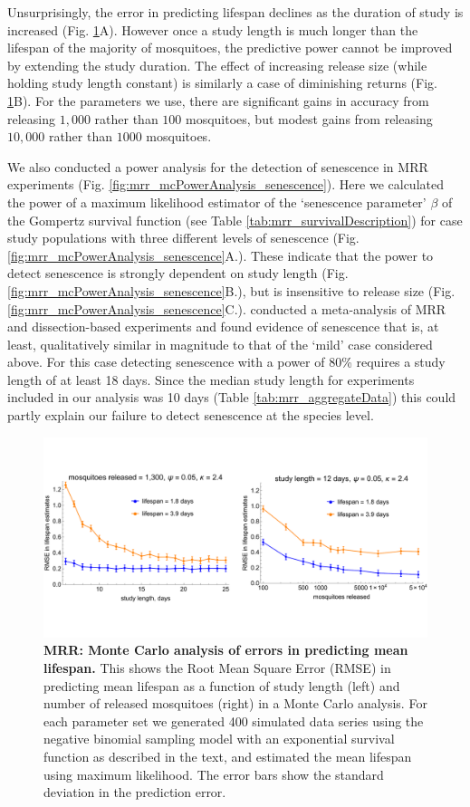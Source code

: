 \documentclass[12pt]{article}
\begin{document}
Unsurprisingly, the error in predicting lifespan declines as the duration of study is increased (Fig. \ref{fig:mrr_mcPowerAnalysis}A). However once a study length is much longer than the lifespan of the majority of mosquitoes, the predictive power cannot be improved by extending the study duration. The effect of increasing release size (while holding study length constant) is similarly a case of diminishing returns (Fig. \ref{fig:mrr_mcPowerAnalysis}B). For the parameters we use, there are significant gains in accuracy from releasing $1,000$ rather than $100$ mosquitoes, but modest gains from releasing $10,000$ rather than $1000$ mosquitoes.

We also conducted a power analysis for the detection of senescence in MRR experiments (Fig. \ref{fig:mrr_mcPowerAnalysis_senescence}). Here we calculated the power of a maximum likelihood estimator of the `senescence parameter' $\beta$ of the Gompertz survival function (see Table \ref{tab:mrr_survivalDescription}) for case study populations with three different levels of senescence (Fig. \ref{fig:mrr_mcPowerAnalysis_senescence}A.). These indicate that the power to detect senescence is strongly dependent on study length (Fig. \ref{fig:mrr_mcPowerAnalysis_senescence}B.), but is insensitive to release size (Fig. \ref{fig:mrr_mcPowerAnalysis_senescence}C.). \cite{clements1981analysis} conducted a meta-analysis of MRR and dissection-based experiments and found evidence of senescence that is, at least, qualitatively similar in magnitude to that of the `mild' case considered above. For this case detecting senescence with a power of 80\% requires a study length of at least 18 days. Since the median study length for experiments included in our analysis was 10 days (Table \ref{tab:mrr_aggregateData}) this could partly explain our failure to detect senescence at the species level.

\begin{figure}[ht]
	\centerline{\includegraphics[width=1.25\textwidth]{./Figure_files/mrr_mcPowerAnalysis.pdf}}
	\caption{\textbf{MRR: Monte Carlo analysis of errors in predicting mean lifespan.} This shows the Root Mean Square Error (RMSE) in predicting mean lifespan as a function of study length (left) and number of released mosquitoes (right) in a Monte Carlo analysis. For each parameter set we generated 400 simulated data series using the negative binomial sampling model with an exponential survival function as described in the text, and estimated the mean lifespan using maximum likelihood. The error bars show the standard deviation in the prediction error.}
	\label{fig:mrr_mcPowerAnalysis}
\end{figure}
\end{document}
